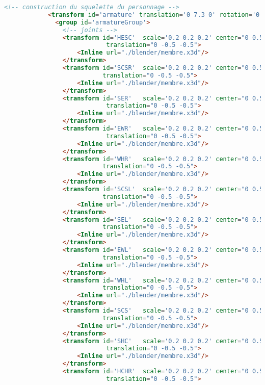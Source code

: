 \begin{lstlisting}[language=Html]
            <!-- construction du squelette du personnage -->
            <transform id='armature' translation='0 7.3 0' rotation='0 1 0 1.57' >
              <group id='armatureGroup'>
                <!-- joints -->
                <transform id='HESC'  scale='0.2 0.2 0.2' center="0 0.5 0" 
                		    translation="0 -0.5 -0.5">
                	<Inline url="./blender/membre.x3d"/>
                </transform>
                <transform id='SCSR'  scale='0.2 0.2 0.2' center="0 0.5 0" 
                		   translation="0 -0.5 -0.5">
                	<Inline url="./blender/membre.x3d"/>
                </transform>              
                <transform id='SER'   scale='0.2 0.2 0.2' center="0 0.5 0" 
                		    translation="0 -0.5 -0.5">
                	<Inline url="./blender/membre.x3d"/>
                </transform>
                <transform id='EWR'   scale='0.2 0.2 0.2' center="0 0.5 0" 
                			translation="0 -0.5 -0.5">
                	<Inline url="./blender/membre.x3d"/>
                </transform>
                <transform id='WHR'   scale='0.2 0.2 0.2' center="0 0.5 0"
                		   translation="0 -0.5 -0.5">
                	<Inline url="./blender/membre.x3d"/>
                </transform>
                <transform id='SCSL'  scale='0.2 0.2 0.2' center="0 0.5 0" 
                		   translation="0 -0.5 -0.5">
                	<Inline url="./blender/membre.x3d"/>
                </transform>             
                <transform id='SEL'   scale='0.2 0.2 0.2' center="0 0.5 0" 
                		   translation="0 -0.5 -0.5">
                	<Inline url="./blender/membre.x3d"/>
                </transform>
                <transform id='EWL'   scale='0.2 0.2 0.2' center="0 0.5 0" 
                		   translation="0 -0.5 -0.5">
                	<Inline url="./blender/membre.x3d"/>
                </transform>
                <transform id='WHL'   scale='0.2 0.2 0.2' center="0 0.5 0" 
                		   translation="0 -0.5 -0.5">
                	<Inline url="./blender/membre.x3d"/>
                </transform>
                <transform id='SCS'   scale='0.2 0.2 0.2' center="0 0.5 0" 
                		   translation="0 -0.5 -0.5">
                	<Inline url="./blender/membre.x3d"/>
                </transform>
                <transform id='SHC'   scale='0.2 0.2 0.2' center="0 0.5 0" 
                			translation="0 -0.5 -0.5">
                	<Inline url="./blender/membre.x3d"/>
                </transform>
                <transform id='HCHR'  scale='0.2 0.2 0.2' center="0 0.5 0" 
                			translation="0 -0.5 -0.5">

\end{lstlisting}
